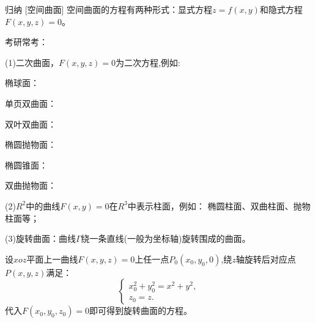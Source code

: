 \documentclass[a4paper,12pt,oneside,fontset=none]{ctexbook}
\newenvironment{induction}[1][]{\begin{thmBox}{归纳}{#1}}{\end{thmBox}}
\numberwithin{equation}{chapter}
\begin{document}
\begin{induction}
    [空间曲面]
    空间曲面的方程有两种形式：显式方程$z = f(x,y)$和隐式方程$F(x,y,z) = 0$。
    
    考研常考：
    
    (1)二次曲面，$F(x,y,z)=0$为二次方程,例如:
    
    椭球面：

    单页双曲面：

    双叶双曲面：

    椭圆抛物面：

    椭圆锥面：

    双曲抛物面：

    (2)$R^2$中的曲线$F(x,y)=0$在$R^3$中表示柱面，例如：
    椭圆柱面、双曲柱面、抛物柱面等；

    (3)旋转曲面：曲线$\varGamma$绕一条直线(一般为坐标轴)旋转围成的曲面。
    
    设$ xoz $平面上一曲线$ F(x,y,z) = 0 $上任一点$P_0(x_0, y_0, 0)$,绕$z$轴旋转后对应点$P(x,y,z)$满足：
    $$\begin{cases}
        x_0^2 + y_0^2 = x^2 + y^2,\\
        z_0 = z.
    \end{cases}$$
    代入$F(x_0,y_0,z_0) = 0$即可得到旋转曲面的方程。
\end{induction}
\end{document}
